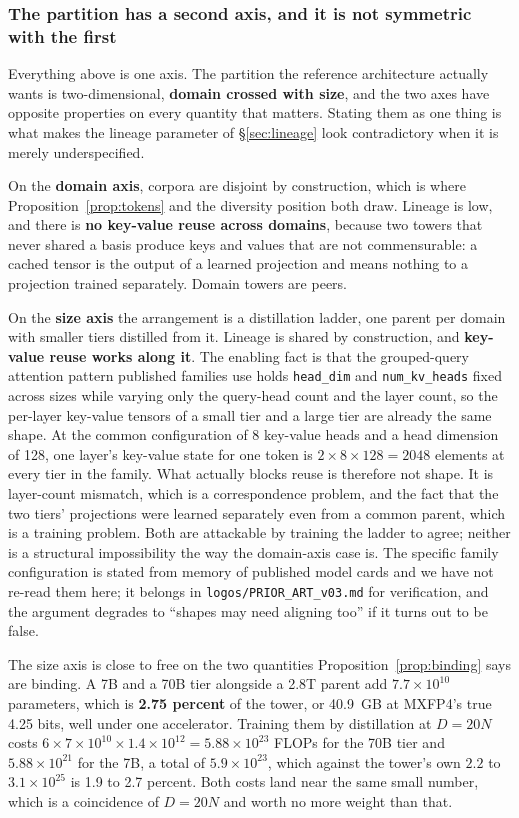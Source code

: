 \documentclass[11pt]{article}
\begin{document}
\subsubsection*{The partition has a second axis, and it is not symmetric with the first}

Everything above is one axis. The partition the reference architecture actually wants is two-dimensional, \textbf{domain crossed with size}, and the two axes have opposite properties on every quantity that matters. Stating them as one thing is what makes the lineage parameter of \S\ref{sec:lineage} look contradictory when it is merely underspecified.

On the \textbf{domain axis}, corpora are disjoint by construction, which is where Proposition~\ref{prop:tokens} and the diversity position both draw. Lineage is low, and there is \textbf{no key-value reuse across domains}, because two towers that never shared a basis produce keys and values that are not commensurable: a cached tensor is the output of a learned projection and means nothing to a projection trained separately. Domain towers are peers.

On the \textbf{size axis} the arrangement is a distillation ladder, one parent per domain with smaller tiers distilled from it. Lineage is shared by construction, and \textbf{key-value reuse works along it}. The enabling fact is that the grouped-query attention pattern published families use holds \texttt{head\_dim} and \texttt{num\_kv\_heads} fixed across sizes while varying only the query-head count and the layer count, so the per-layer key-value tensors of a small tier and a large tier are already the same shape. At the common configuration of 8 key-value heads and a head dimension of 128, one layer's key-value state for one token is $2 \times 8 \times 128 = 2048$ elements at every tier in the family. What actually blocks reuse is therefore not shape. It is layer-count mismatch, which is a correspondence problem, and the fact that the two tiers' projections were learned separately even from a common parent, which is a training problem. Both are attackable by training the ladder to agree; neither is a structural impossibility the way the domain-axis case is. The specific family configuration is stated from memory of published model cards and we have not re-read them here; it belongs in \texttt{logos/PRIOR\_ART\_v03.md} for verification, and the argument degrades to ``shapes may need aligning too'' if it turns out to be false.

The size axis is close to free on the two quantities Proposition~\ref{prop:binding} says are binding. A 7B and a 70B tier alongside a 2.8T parent add $7.7\times10^{10}$ parameters, which is \textbf{2.75 percent} of the tower, or 40.9~GB at MXFP4's true 4.25 bits, well under one accelerator. Training them by distillation at $D = 20N$ costs $6 \times 7\times10^{10} \times 1.4\times10^{12} = 5.88\times10^{23}$ FLOPs for the 70B tier and $5.88\times10^{21}$ for the 7B, a total of $5.9\times10^{23}$, which against the tower's own $2.2$ to $3.1\times10^{25}$ is 1.9 to 2.7 percent. Both costs land near the same small number, which is a coincidence of $D=20N$ and worth no more weight than that.
\end{document}
